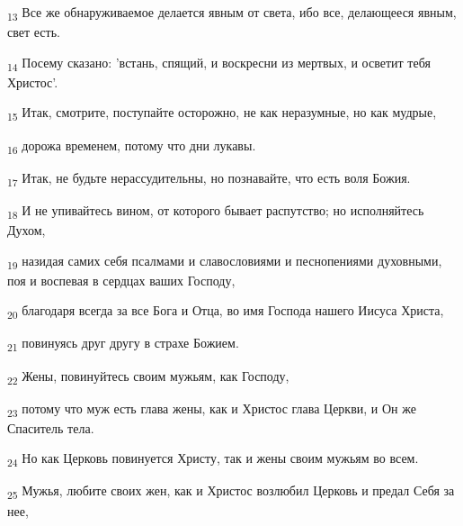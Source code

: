 \begin{tcolorbox}
\textsubscript{13} Все же обнаруживаемое делается явным от света, ибо все, делающееся явным, свет есть.
\end{tcolorbox}
\begin{tcolorbox}
\textsubscript{14} Посему сказано: 'встань, спящий, и воскресни из мертвых, и осветит тебя Христос'.
\end{tcolorbox}
\begin{tcolorbox}
\textsubscript{15} Итак, смотрите, поступайте осторожно, не как неразумные, но как мудрые,
\end{tcolorbox}
\begin{tcolorbox}
\textsubscript{16} дорожа временем, потому что дни лукавы.
\end{tcolorbox}
\begin{tcolorbox}
\textsubscript{17} Итак, не будьте нерассудительны, но познавайте, что есть воля Божия.
\end{tcolorbox}
\begin{tcolorbox}
\textsubscript{18} И не упивайтесь вином, от которого бывает распутство; но исполняйтесь Духом,
\end{tcolorbox}
\begin{tcolorbox}
\textsubscript{19} назидая самих себя псалмами и славословиями и песнопениями духовными, поя и воспевая в сердцах ваших Господу,
\end{tcolorbox}
\begin{tcolorbox}
\textsubscript{20} благодаря всегда за все Бога и Отца, во имя Господа нашего Иисуса Христа,
\end{tcolorbox}
\begin{tcolorbox}
\textsubscript{21} повинуясь друг другу в страхе Божием.
\end{tcolorbox}
\begin{tcolorbox}
\textsubscript{22} Жены, повинуйтесь своим мужьям, как Господу,
\end{tcolorbox}
\begin{tcolorbox}
\textsubscript{23} потому что муж есть глава жены, как и Христос глава Церкви, и Он же Спаситель тела.
\end{tcolorbox}
\begin{tcolorbox}
\textsubscript{24} Но как Церковь повинуется Христу, так и жены своим мужьям во всем.
\end{tcolorbox}
\begin{tcolorbox}
\textsubscript{25} Мужья, любите своих жен, как и Христос возлюбил Церковь и предал Себя за нее,
\end{tcolorbox}
